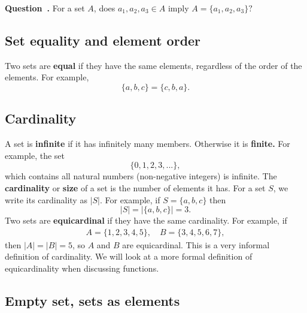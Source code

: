 \documentclass{article}[12pt]
\newcounter{question}
\newenvironment{question}[1][]{\refstepcounter{question}\par\noindent\textbf{Question~\thequestion. #1}\label{q:\thequestion} \rmfamily}{}
\begin{document}
            \begin{question}
                For a set $A$, does $a_1, a_2, a_3 \in A$ imply $A = \{a_1, a_2, a_3\}?$
            \end{question}
            
            
        \subsection{Set equality and element order}
            
            Two sets are \textbf{equal} if they have the same elements, regardless of the order of the elements. For example,
            \begin{equation}
                \{a, b, c\} = \{c, b, a\}.
            \end{equation}
            
        \subsection{Cardinality}
            
            A set is \textbf{infinite} if it has infinitely many members. Otherwise it is \textbf{finite.} For example, the set
            \begin{equation}
                \{0, 1, 2, 3, ...\}, \label{naturals}
            \end{equation}
            which contains all natural numbers (non-negative integers) is infinite. The \textbf{cardinality} or \textbf{size} of a set is the number of elements it has. For a set $S$, we write its cardinality as $|S|.$ For example, if $S = \{a, b, c\}$ then
            \begin{equation}
                |S| = |\{a, b, c\}| = 3.
            \end{equation}
            Two sets are \textbf{equicardinal} if they have the same cardinality. For example, if
            \begin{align}
                A = \{1, 2, 3, 4, 5\}, \quad B = \{3, 4, 5, 6, 7\},
            \end{align}
            then $|A| = |B| = 5$, so $A$ and $B$ are equicardinal. This is a very informal definition of cardinality. We will look at a more formal definition of equicardinality when discussing functions.
            
        \subsection{Empty set, sets as elements}
        
\end{document}
